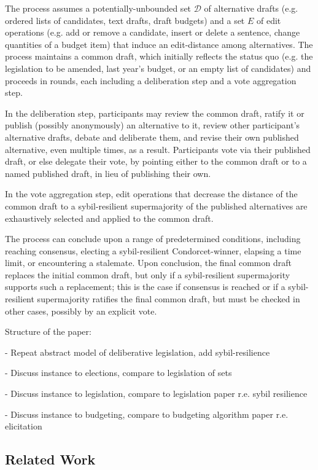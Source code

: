 \documentclass[sigconf]{aamas}  %
\newcommand{\calD}{\mathcal{D}}
\begin{document}
The process assumes a potentially-unbounded set $\calD$ of alternative drafts (e.g. ordered lists of candidates, text drafts, draft budgets) and a set $E$ of edit operations (e.g. add or remove a candidate, insert or delete a sentence, change quantities of a budget item) that induce an edit-distance among alternatives. The process maintains a common draft, which initially reflects the status quo (e.g. the legislation to be amended, last year's budget, or an empty list of candidates) and proceeds in rounds, each including a deliberation step and a vote aggregation step.

In the deliberation step, participants may review the common draft, ratify it or publish (possibly anonymously) an alternative to it, review other participant's alternative drafts, debate and deliberate them, and revise their own published alternative, even multiple times, as a result. Participants vote via their published draft, or else delegate their vote, by pointing either to the common draft or to a named published draft, in lieu of publishing their own.

In the vote aggregation step, edit operations that decrease the distance of the common draft to a sybil-resilient supermajority of the published alternatives are exhaustively selected and applied to the common draft. 

The process can conclude upon a range of predetermined conditions, including reaching consensus, electing a sybil-resilient Condorcet-winner, elapsing a time limit, or encountering a stalemate.  Upon conclusion, the final common draft replaces the initial common draft, but only if a sybil-resilient supermajority supports such a replacement; this is the case if consensus is reached or if a sybil-resilient supermajority ratifies the final common draft, but must be checked in other cases, possibly by an explicit vote.



Structure of the paper:

- Repeat abstract model of deliberative legislation, add sybil-resilience

- Discuss instance to elections, compare to legislation of sets

- Discuss instance to legislation, compare to legislation paper r.e. sybil resilience

- Discuss instance to budgeting, compare to budgeting algorithm paper r.e. elicitation


\subsection{Related Work}
\end{document}
